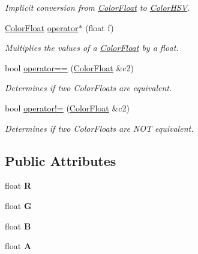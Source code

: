\begin{DoxyCompactItemize}
\begin{DoxyCompactList}\small\item\em Implicit conversion from \hyperlink{structtsgl_1_1_color_float}{Color\+Float} to \hyperlink{structtsgl_1_1_color_h_s_v}{Color\+H\+S\+V}. \end{DoxyCompactList}\item 
\hyperlink{structtsgl_1_1_color_float}{Color\+Float} \hyperlink{structtsgl_1_1_color_float_a09d7cc47ac3d0e23ef7339ccf33111a5}{operator$\ast$} (float f)
\begin{DoxyCompactList}\small\item\em Multiplies the values of a \hyperlink{structtsgl_1_1_color_float}{Color\+Float} by a float. \end{DoxyCompactList}\item 
bool \hyperlink{structtsgl_1_1_color_float_ac29ecf4a36624050af433d691e65651c}{operator==} (\hyperlink{structtsgl_1_1_color_float}{Color\+Float} \&c2)
\begin{DoxyCompactList}\small\item\em Determines if two Color\+Floats are equivalent. \end{DoxyCompactList}\item 
bool \hyperlink{structtsgl_1_1_color_float_afd92fcf8743d931cfbcf405209c923fc}{operator!=} (\hyperlink{structtsgl_1_1_color_float}{Color\+Float} \&c2)
\begin{DoxyCompactList}\small\item\em Determines if two Color\+Floats are {\itshape N\+O\+T} equivalent. \end{DoxyCompactList}\end{DoxyCompactItemize}
\subsection*{Public Attributes}
\begin{DoxyCompactItemize}
\item 
\hypertarget{structtsgl_1_1_color_float_a15c36dbebaccfc982b0b07af95214d10}{}float {\bfseries R}\label{structtsgl_1_1_color_float_a15c36dbebaccfc982b0b07af95214d10}

\item 
\hypertarget{structtsgl_1_1_color_float_a7a7f1659d2f7694625f4a393a57686b4}{}float {\bfseries G}\label{structtsgl_1_1_color_float_a7a7f1659d2f7694625f4a393a57686b4}

\item 
\hypertarget{structtsgl_1_1_color_float_ae0c874ce1bc4a3fb725bbae35411a794}{}float {\bfseries B}\label{structtsgl_1_1_color_float_ae0c874ce1bc4a3fb725bbae35411a794}

\item 
\hypertarget{structtsgl_1_1_color_float_aba05ee650a72ae8e3c4683b54bf192fb}{}float {\bfseries A}\label{structtsgl_1_1_color_float_aba05ee650a72ae8e3c4683b54bf192fb}

\end{DoxyCompactItemize}


